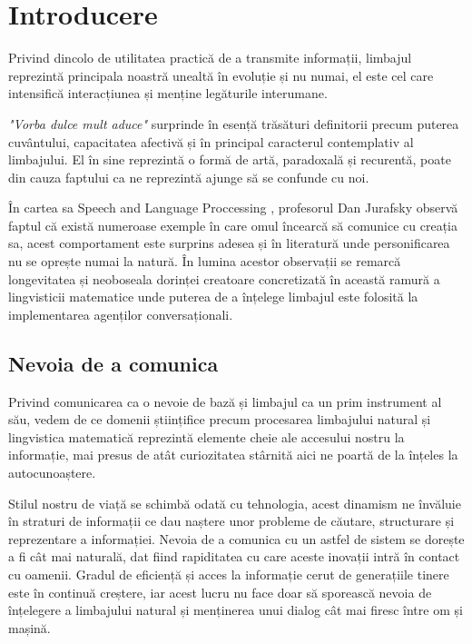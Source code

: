 \chapter{Introducere}


Privind dincolo de utilitatea practică de a transmite informații, limbajul reprezintă principala noastră unealtă în evoluție și nu numai, el este cel care intensifică interacțiunea și menține legăturile interumane.

\textit{"Vorba dulce mult aduce"} surprinde în esență trăsături definitorii precum puterea cuvântului, capacitatea afectivă și în principal caracterul contemplativ al limbajului. El în sine reprezintă o formă de artă, paradoxală și recurentă, poate din cauza faptului ca ne reprezintă ajunge să se confunde cu noi.

În cartea sa Speech and Language Proccessing \cite{speach__lang_processing}, profesorul Dan Jurafsky observă faptul că există numeroase exemple în care omul încearcă să comunice cu creația sa, acest comportament este surprins adesea și în literatură unde personificarea nu se oprește numai la natură. În lumina acestor observații se remarcă longevitatea și neoboseala dorinței creatoare concretizată în această ramură a lingvisticii matematice unde puterea de a înțelege limbajul este folosită la implementarea agenților conversaționali.


\section{Nevoia de a comunica}

Privind comunicarea ca o nevoie de bază și limbajul ca un prim instrument al său, vedem de ce domenii științifice precum procesarea limbajului natural și lingvistica matematică reprezintă elemente cheie ale accesului nostru la informație, mai presus de atât curiozitatea stârnită aici ne poartă de la înțeles la autocunoaștere.

Stilul nostru de viață se schimbă odată cu tehnologia, acest dinamism ne învăluie în straturi de informații ce dau naștere unor probleme de căutare, structurare și reprezentare a informației. Nevoia de a comunica cu un astfel de sistem se dorește a fi cât mai naturală, dat fiind rapiditatea cu care aceste inovații intră în contact cu oamenii. Gradul de eficiență și acces la informație cerut de generațiile tinere este în continuă creștere, iar acest lucru nu face doar să sporească nevoia de înțelegere a limbajului natural și menținerea unui dialog cât mai firesc între om și mașină.

